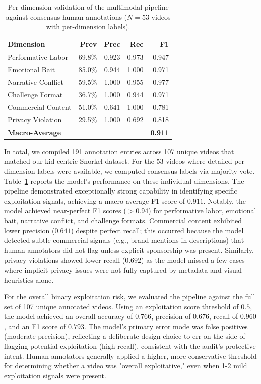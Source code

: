\documentclass[letterpaper]{article} %
\begin{document}
\begin{table}[t]
\centering
\small
\begin{tabular}{lrrrr}
\toprule
\textbf{Dimension} & \textbf{Prev} & \textbf{Prec} & \textbf{Rec} & \textbf{F1} \\
\midrule
Performative Labor & 69.8\% & 0.923 & 0.973 & 0.947 \\
Emotional Bait & 85.0\% & 0.944 & 1.000 & 0.971 \\
Narrative Conflict & 59.5\% & 1.000 & 0.955 & 0.977 \\
Challenge Format & 36.7\% & 1.000 & 0.944 & 0.971 \\
Commercial Content & 51.0\% & 0.641 & 1.000 & 0.781 \\
Privacy Violation & 29.5\% & 1.000 & 0.692 & 0.818 \\
\midrule
\textbf{Macro-Average} & & & & \textbf{0.911} \\
\bottomrule
\end{tabular}
\caption{Per-dimension validation of the multimodal pipeline against consensus human annotations ($N=53$ videos with per-dimension labels).}
\label{tab:validation_dims}
\end{table}

In total, we compiled 191 annotation entries across 107 unique videos that matched our kid-centric Snorkel dataset. For the 53 videos where detailed per-dimension labels were available, we computed consensus labels via majority vote. Table~\ref{tab:validation_dims} reports the model's performance on these individual dimensions. The pipeline demonstrated exceptionally strong capability in identifying specific exploitation signals, achieving a macro-average F1 score of $0.911$. Notably, the model achieved near-perfect F1 scores ($>0.94$) for performative labor, emotional bait, narrative conflict, and challenge formats. Commercial content exhibited lower precision ($0.641$) despite perfect recall; this occurred because the model detected subtle commercial signals (e.g., brand mentions in descriptions) that human annotators did not flag unless explicit sponsorship was present. Similarly, privacy violations showed lower recall ($0.692$) as the model missed a few cases where implicit privacy issues were not fully captured by metadata and visual heuristics alone.

For the overall binary exploitation risk, we evaluated the pipeline against the full set of 107 unique annotated videos. Using an exploitation score threshold of $0.5$, the model achieved an overall accuracy of $0.766$, precision of $0.676$, recall of $0.960$, and an F1 score of $0.793$. The model's primary error mode was false positives (moderate precision), reflecting a deliberate design choice to err on the side of flagging potential exploitation (high recall), consistent with the audit's protective intent. Human annotators generally applied a higher, more conservative threshold for determining whether a video was "overall exploitative," even when 1-2 mild exploitation signals were present.
\end{document}
